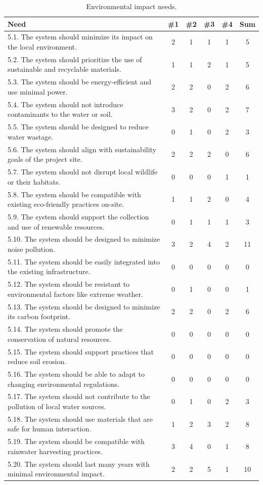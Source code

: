 \documentclass[12pt]{report}
\begin{document}
\renewcommand{\thetable}{\thechapter.1e}
\newpage
\begin{table}[H]
\centering
\caption{Environmental impact needs.}
\label{table:1e}
\begin{tabular}{|p{10cm}|c|c|c|c|c|}
\hline
\textbf{Need} & \textbf{\#1} & \textbf{\#2} & \textbf{\#3} & \textbf{\#4} & \textbf{Sum} \\
\hline
5.1. The system should minimize its impact on the local environment. & 2 & 1 & 1 & 1 & 5 \\
5.2. The system should prioritize the use of sustainable and recyclable materials. & 1 & 1 & 2 & 1 & 5 \\
5.3. The system should be energy-efficient and use minimal power. & 2 & 2 & 0 & 2 & 6 \\
5.4. The system should not introduce contaminants to the water or soil. & 3 & 2 & 0 & 2 & 7 \\
5.5. The system should be designed to reduce water wastage. & 0 & 1 & 0 & 2 & 3 \\
5.6. The system should align with sustainability goals of the project site. & 2 & 2 & 2 & 0 & 6 \\
5.7. The system should not disrupt local wildlife or their habitats. & 0 & 0 & 0 & 1 & 1 \\
5.8. The system should be compatible with existing eco-friendly practices on-site. & 1 & 1 & 2 & 0 & 4 \\
5.9. The system should support the collection and use of renewable resources. & 0 & 1 & 1 & 1 & 3 \\
5.10. The system should be designed to minimize noise pollution. & 3 & 2 & 4 & 2 & \cellcolor{yellow}11 \\
5.11. The system should be easily integrated into the existing infrastructure. & 0 & 0 & 0 & 0 & 0 \\
5.12. The system should be resistant to environmental factors like extreme weather. & 0 & 1 & 0 & 0 & 1 \\
5.13. The system should be designed to minimize its carbon footprint. & 2 & 2 & 0 & 2 & 6 \\
5.14. The system should promote the conservation of natural resources. & 0 & 0 & 0 & 0 & 0 \\
5.15. The system should support practices that reduce soil erosion. & 0 & 0 & 0 & 0 & 0 \\
5.16. The system should be able to adapt to changing environmental regulations. & 0 & 0 & 0 & 0 & 0 \\
5.17. The system should not contribute to the pollution of local water sources. & 0 & 1 & 0 & 2 & 3 \\
5.18. The system should use materials that are safe for human interaction. & 1 & 2 & 3 & 2 & \cellcolor{yellow}8 \\
5.19. The system should be compatible with rainwater harvesting practices. & 3 & 4 & 0 & 1 & \cellcolor{yellow}8 \\
5.20. The system should last many years with minimal environmental impact. & 2 & 2 & 5 & 1 & \cellcolor{yellow}10 \\
\hline
\end{tabular}
\end{table}
\end{document}

